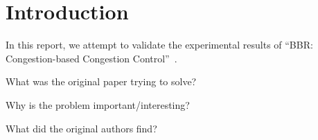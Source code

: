 
\section{Introduction}
In this report, we attempt to validate the experimental results of ``BBR:
Congestion-based Congestion Control''~\cite{cardwell2016bbr}.

What was the original paper trying to solve?

Why is the problem important/interesting?

What did the original authors find?

